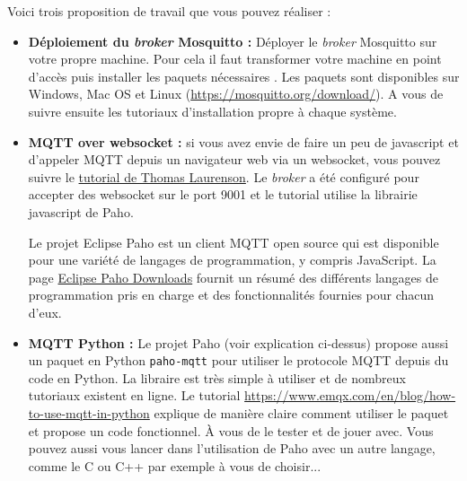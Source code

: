 \documentclass[11pt]{paper}
\newcommand\broker{{\it broker}\xspace}
\begin{document}
Voici trois proposition de travail que vous pouvez réaliser :
\begin{itemize}
	\item {\bf Déploiement du \broker Mosquitto :} Déployer le \broker Mosquitto sur votre propre machine. Pour cela il faut transformer votre machine en point d'accès puis installer les paquets nécessaires . Les paquets sont disponibles sur Windows, Mac OS et Linux (\url{https://mosquitto.org/download/}). A vous de suivre ensuite les tutoriaux d'installation propre à chaque système.
	
	\item {\bf MQTT over websocket :} si vous avez envie de faire un peu de javascript et d'appeler MQTT depuis un navigateur web via un websocket, vous pouvez suivre le \href{https://www.thomaslaurenson.com/blog/2018-07-10/mqtt-web-app-using-javascript-and-websockets/}{tutorial de Thomas Laurenson}. Le \broker a été configuré pour accepter des websocket sur le port 9001 et le tutorial utilise la librairie javascript de Paho.
	
	Le projet Eclipse Paho est un client MQTT open source qui est disponible pour une variété de langages de programmation, y compris JavaScript. La page \href{https://www.eclipse.org/paho/index.php?page=downloads.php}{Eclipse Paho Downloads} fournit un résumé des différents langages de programmation pris en charge et des fonctionnalités fournies pour chacun d'eux.
	 
	\item {\bf MQTT Python :} Le projet Paho (voir explication ci-dessus) propose aussi un paquet en Python {\tt paho-mqtt} pour utiliser le protocole MQTT depuis du code en Python. La libraire est très simple à utiliser et de nombreux tutoriaux existent en ligne. 
	Le tutorial \url{https://www.emqx.com/en/blog/how-to-use-mqtt-in-python} explique de manière claire comment utiliser le paquet et propose un code fonctionnel. \`A vous de le tester et de jouer avec. Vous pouvez aussi vous lancer dans l'utilisation de Paho avec un autre langage, comme le C ou C++ par exemple à vous de choisir...
\end{itemize}
\end{document}
